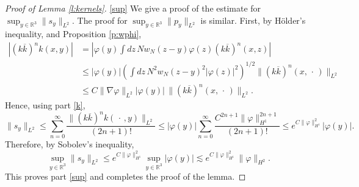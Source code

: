 \documentclass[11pt,a4paper]{scrartcl}
\newcommand{\R}{\mathds{R}}
\begin{document}
\begin{proof}[Proof of Lemma \ref{l:kernels}]
  \ref{sup} We give a proof of the estimate for $\sup_{y \in \R^3} \| s_y
  \|_{L^2}$. The proof for $\sup_{y \in \R^3} \| p_y \|_{L^2}$ is similar.
  First, by H\"older's inequality, and Proposition \ref{p:wphi},
  \begin{align*}
    |(k \overline{k})^n k(x,y)| & = \left| \varphi(y) \int dz \, N w_N(z-y)
    \varphi(z) (k \overline{k})^n(x,z) \right| \\
    & \le |\varphi(y)| \left( \int dz \, N^2 w_N(z-y)^2 |\varphi(z)|^2
    \right)^{1/2} \| (k \overline{k})^n(x,\, \cdot\,) \|_{L^2} \\
    & \le C \| \nabla \varphi \|_{L^2} | \varphi(y)| \, \| (k \overline{k}
    )^n(x,\, \cdot\,) \|_{L^2}.
  \end{align*}
  Hence, using part \ref{k},
  \[
    \| s_y \|_{L^2} \le \sum_{n=0}^\infty \frac{\| (k \overline{k})^n k(\,
    \cdot\,,y) \|_{L^2}}{(2n+1)!} \le |\varphi(y)| \sum_{n=0}^\infty
    \frac{C^{2n+1} \| \varphi \|_{H^1}^{2n+1}}{(2n+1)!} \le e^{C \|
    \varphi\|_{H^1}^2} |\varphi(y)|.
  \]
  Therefore, by Sobolev's inequality,
  \[
    \sup_{y \in \R^3} \| s_y \|_{L^2} \le e^{C \| \varphi \|_{H^1}^2} \sup_{y
    \in \R^3} |\varphi(y)| \apprle e^{C \| \varphi \|_{H^1}^2} \| \varphi
    \|_{H^2}.
  \]
  This proves part \ref{sup} and completes the proof of the lemma.
\end{proof}
\end{document}
